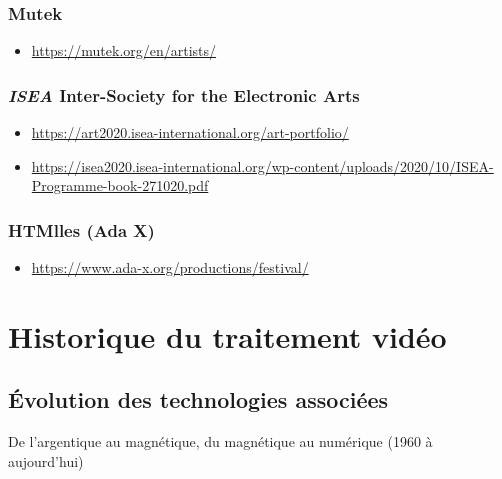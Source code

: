 \documentclass[
  french,
]{book}
\providecommand{\tightlist}{%
  \setlength{\itemsep}{0pt}\setlength{\parskip}{0pt}}
\begin{document}
\hypertarget{mutek}{%
\subsection{Mutek}\label{mutek}}

\begin{itemize}
\tightlist
\item
  \url{https://mutek.org/en/artists/}
\end{itemize}

\hypertarget{isea-inter-society-for-the-electronic-arts}{%
\subsection{\texorpdfstring{\emph{ISEA} Inter-Society for the Electronic Arts}{ISEA Inter-Society for the Electronic Arts}}\label{isea-inter-society-for-the-electronic-arts}}

\begin{itemize}
\tightlist
\item
  \url{https://art2020.isea-international.org/art-portfolio/}
\item
  \url{https://isea2020.isea-international.org/wp-content/uploads/2020/10/ISEA-Programme-book-271020.pdf}
\end{itemize}

\hypertarget{htmlles-ada-x}{%
\subsection{HTMlles (Ada X)}\label{htmlles-ada-x}}

\begin{itemize}
\tightlist
\item
  \url{https://www.ada-x.org/productions/festival/}
\end{itemize}

\hypertarget{historique}{%
\chapter{Historique du traitement vidéo}\label{historique}}

\hypertarget{evolution_historique_technologies}{%
\section{Évolution des technologies associées}\label{evolution_historique_technologies}}

De l'argentique au magnétique, du magnétique au numérique (1960 à aujourd'hui)
\end{document}
